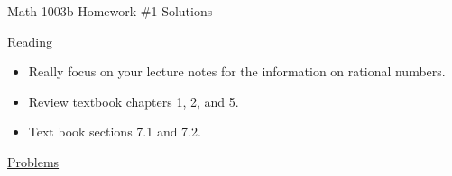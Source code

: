\documentclass[letterpaper,12pt,fleqn]{article}
\begin{document}
\begin{center}
\Large Math-1003b Homework \#1 Solutions
\end{center}

\vspace{0.5in}

\underline{Reading}

\bigskip

\begin{itemize}
\item Really focus on your lecture notes for the information on rational
  numbers.
\item Review textbook chapters 1, 2, and 5.
\item Text book sections 7.1 and 7.2.
\end{itemize}

\bigskip

\underline{Problems}

\bigskip
\end{document}
